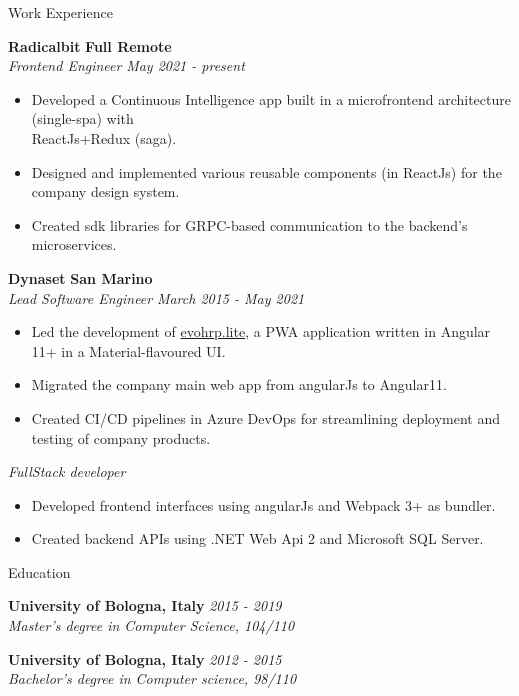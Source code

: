 \documentclass{resume} %
\begin{document}
\begin{rSection}{Work Experience}

  {\bf Radicalbit} \hfill {\bf Full Remote}
  \\{\textit{Frontend Engineer}} \hfill {\em May 2021 - present}
  \begin{itemize}
    \item Developed a Continuous Intelligence app built in a
    microfrontend architecture (single-spa) with \\ ReactJs+Redux (saga).
    \item Designed and implemented various reusable components (in ReactJs) for the
    company design system.
    \item Created sdk libraries for GRPC-based communication to the
    backend's microservices.
  \end{itemize}
  {\bf Dynaset} \hfill  {\bf San Marino}
  \\{\textit{Lead Software Engineer}} \hfill {\em  March 2015 - May 2021}
  \begin{itemize}
    \item Led the development of
    \href{https://evohrplite.app/}{evohrp.lite}, a PWA application written in Angular 11+ in a Material-flavoured UI.
    \item Migrated the company main web app from angularJs to Angular11.
    \item Created CI/CD pipelines in Azure DevOps for streamlining deployment and testing of company products.
  \end{itemize}
  {\textit{FullStack developer}}
  \begin{itemize}
    \item Developed frontend interfaces using angularJs and Webpack 3+ as bundler.
    \item Created backend APIs using .NET Web Api 2 and Microsoft SQL Server.
  \end{itemize}
  
\end{rSection}

\begin{rSection}{Education}

{\bf University of Bologna, Italy } \hfill {\em 2015 - 2019} 
\\{ \textit {Master's degree in Computer Science, 104/110 }} 

{\bf University of Bologna, Italy } \hfill {\em 2012 - 2015} 
\\ { \textit {Bachelor's degree in Computer science, 98/110 }} \hfill


\end{rSection}
\end{document}
